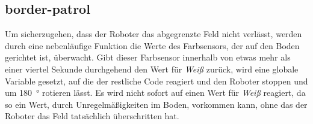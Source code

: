 \documentclass{fetch-my-doc}
\begin{document}
		
		\subsection{border-patrol}
		Um sicherzugehen, dass der Roboter das abgegrenzte Feld nicht verlässt, werden durch eine nebenläufige Funktion die Werte des Farbsensors, der auf den Boden gerichtet ist, überwacht. Gibt dieser Farbsensor innerhalb von etwas mehr als einer viertel Sekunde durchgehend den Wert für \textit{Weiß} zurück, wird eine globale Variable gesetzt, auf die der restliche Code reagiert und den Roboter stoppen und um \SI{180}{\degree} rotieren lässt. Es wird nicht sofort auf einen Wert für \textit{Weiß} reagiert, da so ein Wert, durch Unregelmäßigkeiten im Boden, vorkommen kann, ohne das der Roboter das Feld tatsächlich überschritten hat.

				
		
	
	
\end{document}
